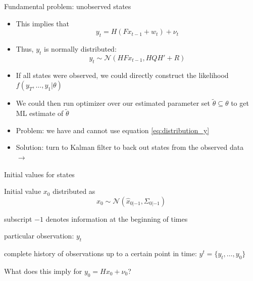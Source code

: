 \documentclass[handout,usepdftitle=false,xcolor=dvipsnames,aspectratio=169]{beamer}
\begin{document}
\begin{frame}{Fundamental problem: unobserved states}

  \begin{itemize}
    \item This implies that
          \begin{equation}
            y_t = H\left( {F{x_{t - 1}} + {w_t}} \right) + {\nu _t}
          \end{equation}
    \item Thus, $y_t$ is normally distributed:
          \begin{equation}
            y_t\sim \mathcal{N}(HFx_{t-1},HQH' + R) \label{eq:distribution_y}
          \end{equation}
    \item If all states were observed, we could directly construct the likelihood $f(y_T,\dots,y_1|\theta)$\vspace{0.2cm}
    \item We could then run optimizer over our estimated parameter set $\tilde \theta \subseteq \theta $ to get ML estimate of $\tilde \theta$\vspace{0.2cm}
    \item Problem: we have  and cannot use equation \eqref{eq:distribution_y}\vspace{0.2cm}
    \item Solution: turn to Kalman filter to back out states from the observed data\\
          $\rightarrow$ 
  \end{itemize}
\end{frame}



\begin{frame}{Initial values for states}

  \begin{witemize}
    \item Initial value $x_0$ distributed as
    \begin{equation}
      x_0 \sim \mathcal{N}\left(\hat{x}_{0|-1},\Sigma_{0|-1} \right)
    \end{equation}
    \item subscript $-1$ denotes information at the beginning of times\vspace{0.2cm}
    \item particular observation: $y_t$ \vspace{0.2cm}
    \item complete history of observations up to a certain point in time: $y^t=\{y_t,\ldots,y_0\}$\vspace{0.2cm}
    \item What does this imply for $y_0= H{x_0} + {\nu _0}$?
  \end{witemize}
\end{frame}
\end{document}
